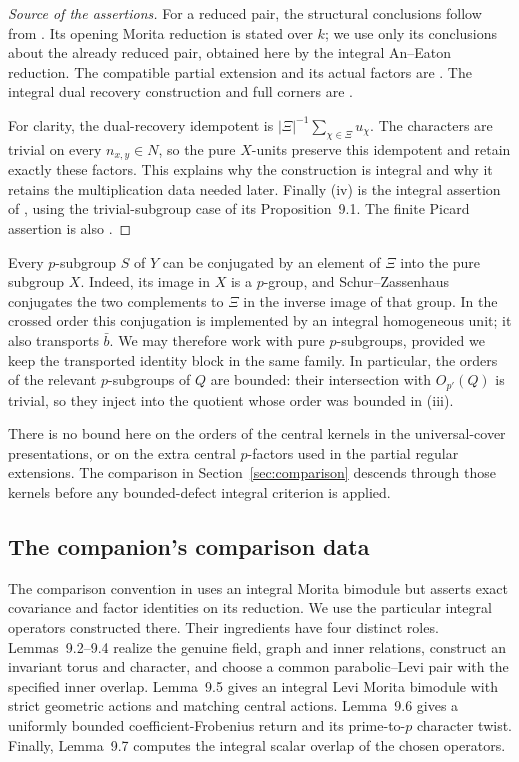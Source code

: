 \begin{proof}[Source of the assertions]
For a reduced pair, the structural conclusions follow from
\cite[Lemma~8.1]{OpenAIFieldDonovan2026}.  Its opening Morita
reduction is stated over $k$; we use only its conclusions about the
already reduced pair, obtained here by the integral An--Eaton
reduction.  The compatible partial extension and its actual factors
are \cite[Lemma~8.2]{OpenAIFieldDonovan2026}.  The integral dual
recovery construction and full corners are
\cite[Lemma~8.3]{OpenAIFieldDonovan2026}.

For clarity, the dual-recovery idempotent is
$|\Xi|^{-1}\sum_{\chi\in\Xi}u_\chi$.  The characters are trivial
on every $n_{x,y}\in N$, so the pure $X$-units preserve this
idempotent and retain exactly these factors.  This explains why
the construction is integral and why it retains the multiplication
data needed later.  Finally (iv) is the integral assertion of
\cite[Lemma~8.5]{OpenAIFieldDonovan2026}, using the trivial-subgroup
case of its Proposition~9.1.  The finite Picard assertion is also
\cite[Theorem~B and Corollary~1.2]{EiseleGeometry2022}.
\end{proof}

Every $p$-subgroup $S$ of $Y$ can be conjugated by an element of
$\Xi$ into the pure subgroup $X$.  Indeed, its image in $X$ is a
$p$-group, and Schur--Zassenhaus conjugates the two complements to
$\Xi$ in the inverse image of that group.  In the crossed order this
conjugation is implemented by an integral homogeneous unit; it also
transports $\bar b$.  We may therefore work with pure $p$-subgroups,
provided we keep the transported identity block in the same family.
In particular, the orders of the relevant $p$-subgroups of $Q$ are
bounded: their intersection with $O_{p'}(Q)$ is trivial, so they
inject into the quotient whose order was bounded in (iii).

There is no bound here on the orders of the central kernels in the
universal-cover presentations, or on the extra central $p$-factors
used in the partial regular extensions.  The comparison in
Section~\ref{sec:comparison} descends through those kernels before
any bounded-defect integral criterion is applied.

\subsection{The companion's comparison data}

The comparison convention in
\cite[Definition~8.4 and Proposition~9.1]{OpenAIFieldDonovan2026}
uses an integral Morita bimodule but asserts exact covariance and
factor identities on its reduction.  We use the particular integral
operators constructed there.  Their ingredients have four distinct
roles.  Lemmas~9.2--9.4 realize the genuine field, graph and inner
relations, construct an invariant torus and character, and choose a
common parabolic--Levi pair with the specified inner overlap.
Lemma~9.5 gives an integral Levi Morita bimodule with strict geometric
actions and matching central actions.  Lemma~9.6 gives a uniformly
bounded coefficient-Frobenius return and its prime-to-$p$ character
twist.  Finally, Lemma~9.7 computes the integral scalar overlap of
the chosen operators.

